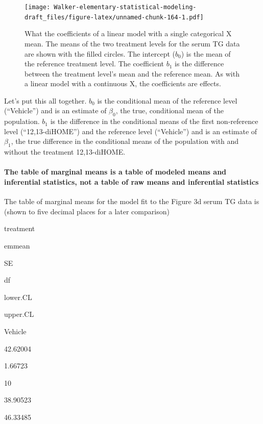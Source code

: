 \documentclass[]{book}
\let\oldparagraph\paragraph
\renewcommand{\paragraph}[1]{\oldparagraph{#1}\mbox{}}
\begin{document}
\begin{figure}
\centering
\texttt{[image: Walker-elementary-statistical-modeling-draft\_files/figure-latex/unnamed-chunk-164-1.pdf]}
\caption{\label{fig:unnamed-chunk-164}What the coefficients of a linear model with a single categorical X mean. The means of the two treatment levels for the serum TG data are shown with the filled circles. The intercept (\(b_0\)) is the mean of the reference treatment level. The coefficient \(b_1\) is the difference between the treatment level's mean and the reference mean. As with a linear model with a continuous X, the coefficients are effects.}
\end{figure}

Let's put this all together. \(b_0\) is the conditional mean of the reference level (``Vehicle'') and is an estimate of \(\beta_0\), the true, conditional mean of the population. \(b_1\) is the difference in the conditional means of the first non-reference level (``12,13-diHOME'') and the reference level (``Vehicle'') and is an estimate of \(\beta_1\), the true difference in the conditional means of the population with and without the treatment 12,13-diHOME.

\hypertarget{the-table-of-marginal-means-is-a-table-of-modeled-means-and-inferential-statistics-not-a-table-of-raw-means-and-inferential-statistics}{%
\paragraph{The table of marginal means is a table of modeled means and inferential statistics, not a table of raw means and inferential statistics}\label{the-table-of-marginal-means-is-a-table-of-modeled-means-and-inferential-statistics-not-a-table-of-raw-means-and-inferential-statistics}}

The table of marginal means for the model fit to the Figure 3d serum TG data is (shown to five decimal places for a later comparison)

treatment

emmean

SE

df

lower.CL

upper.CL

Vehicle

42.62004

1.66723

10

38.90523

46.33485
\end{document}
